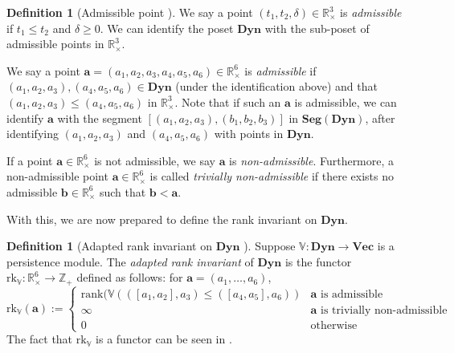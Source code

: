\documentclass[a4paper,UKenglish,thm-restate]{article}
\theoremstyle{definition}
\newtheorem{definition}[theorem]{Definition}
\def\bbv{\mathbb{V}}
\def\bdyn{\mathbf{Dyn}}
\def\bvec{\mathbf{Vec}}
\begin{document}
        \begin{definition}[Admissible point \cite{spatiotemporal}]
            We say a point $(t_1, t_2, \delta) \in \mathbb{R}_{\times}^3$ is \emph{admissible} if $t_1 \leq t_2$ and $\delta \geq 0$. We can identify the poset $\bdyn$ with the sub-poset of admissible points in $\mathbb{R}_{\times}^3$.

            We say a point $\mathbf{a} = (a_1, a_2, a_3, a_4, a_5, a_6) \in \mathbb{R}_{\times}^6$ is \emph{admissible} if $(a_1, a_2, a_3), (a_4, a_5, a_6) \in \bdyn$ (under the identification above) and that $(a_1, a_2, a_3) \leq (a_4, a_5, a_6)$ in $\mathbb{R}_{\times}^3$. Note that if such an $\mathbf{a}$ is admissible, we can identify $\mathbf{a}$ with the segment $[(a_1, a_2, a_3), (b_1, b_2, b_3)]$ in $\mathbf{Seg}({\bdyn})$, after identifying $(a_1, a_2, a_3)$ and $(a_4, a_5, a_6)$ with points in $\bdyn$.
            
            If a point $\mathbf{a} \in \mathbb{R}_{\times}^6$ is not admissible, we say $\mathbf{a}$ is \emph{non-admissible}. Furthermore, a non-admissible point $\mathbf{a} \in \mathbb{R}_{\times}^6$ is called \emph{trivially non-admissible} if there exists no admissible $\mathbf{b} \in \mathbb{R}_{\times}^6$ such that $\mathbf{b} < \mathbf{a}$.
        \end{definition}

        With this, we are now prepared to define the rank invariant on $\bdyn$.
        \begin{definition}[Adapted rank invariant on $\bdyn$ \cite{spatiotemporal}] \label{def:bdynrankinvariant}
            Suppose $\bbv: \bdyn \rightarrow \bvec$ is a persistence module. The \emph{adapted rank invariant} of $\bdyn$ is the functor $\mathrm{rk}_\bbv: \mathbb{R}_{\times}^6 \rightarrow \mathbb{Z}_+$ defined as follows: for $\mathbf{a} = (a_1, \ldots, a_6)$,
            \[\mathrm{rk}_\bbv(\mathbf{a}) := \begin{cases} \mathrm{rank}(\bbv(([a_1, a_2], a_3) \leq ([a_4, a_5], a_6)) & \mathbf{a} \text{ is admissible} \\ \infty & \mathbf{a} \text{ is trivially non-admissible} \\ 0 & \text{otherwise} \end{cases}\]
            The fact that $\mathrm{rk}_\bbv$ is a functor can be seen in \cite[Proposition 4.3]{spatiotemporal}.
        \end{definition}
\end{document}
